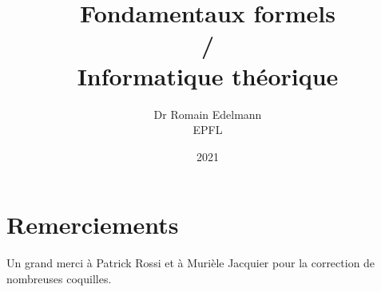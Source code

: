 \documentclass[12pt,french,a4paper]{memoir}
\begin{document}
\title{Fondamentaux formels\\/\\Informatique théorique}
\author{Dr Romain Edelmann\\EPFL}
\date{2021}
\maketitle

\frontmatter

\chapter*{Remerciements}

Un grand merci à Patrick Rossi et à Murièle Jacquier pour la correction de nombreuses coquilles.

\newpage

\tableofcontents

\mainmatter








\end{document}
